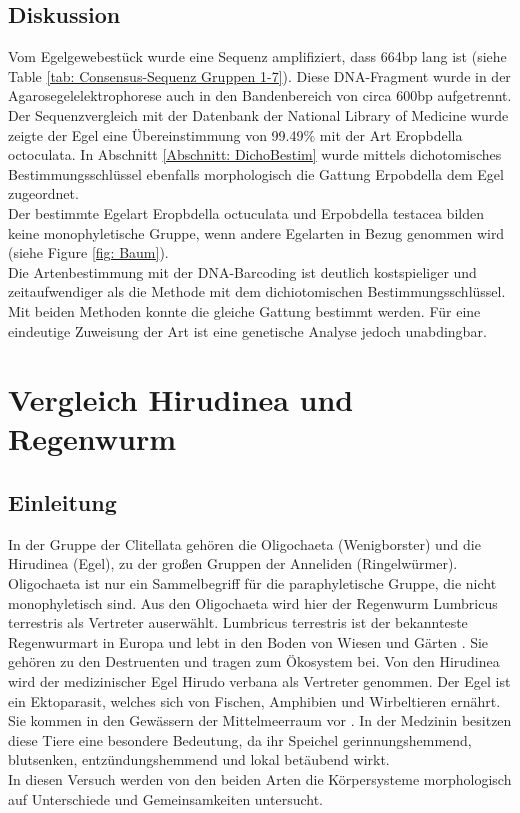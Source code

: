 \documentclass[oneside,10pt,a4paper]{report}
\begin{document}
			\subsection{Diskussion}
				Vom Egelgewebestück wurde eine Sequenz amplifiziert, dass 664bp lang ist (siehe Table \ref{tab: Consensus-Sequenz Gruppen 1-7}). Diese DNA-Fragment wurde in der Agarosegelelektrophorese auch in den Bandenbereich von circa 600bp aufgetrennt.\\
				Der Sequenzvergleich mit der Datenbank der National Library of Medicine wurde zeigte der Egel eine  Übereinstimmung von 99.49$\%$ mit der Art Eropbdella octoculata.  
				In Abschnitt \ref{Abschnitt: DichoBestim} wurde mittels dichotomisches Bestimmungsschlüssel ebenfalls morphologisch die Gattung Erpobdella dem Egel zugeordnet.\\
				Der bestimmte Egelart Eropbdella octuculata und Erpobdella testacea bilden keine monophyletische Gruppe, wenn andere Egelarten in Bezug genommen wird (siehe Figure \ref{fig: Baum}).\\
				Die Artenbestimmung mit der DNA-Barcoding ist deutlich kostspieliger und zeitaufwendiger als die Methode mit dem dichiotomischen Bestimmungsschlüssel. Mit beiden Methoden konnte die gleiche Gattung bestimmt werden.
				Für eine eindeutige Zuweisung der Art ist eine genetische Analyse jedoch unabdingbar.

				
		\section{Vergleich Hirudinea und Regenwurm}
			\subsection{Einleitung}
				In der Gruppe der Clitellata gehören die Oligochaeta (Wenigborster) und die Hirudinea (Egel), zu der großen Gruppen der Anneliden (Ringelwürmer).
				Oligochaeta ist nur ein Sammelbegriff für die paraphyletische Gruppe, die nicht monophyletisch sind. Aus den Oligochaeta wird hier der Regenwurm Lumbricus terrestris als Vertreter auserwählt. Lumbricus terrestris ist der bekannteste Regenwurmart in Europa und lebt in den Boden von Wiesen und Gärten \cite{regenwurm}. Sie gehören zu den Destruenten und tragen zum Ökosystem bei. Von den Hirudinea wird der medizinischer Egel Hirudo verbana als Vertreter genommen. Der Egel ist ein Ektoparasit, welches sich von Fischen, Amphibien und Wirbeltieren ernährt. Sie kommen in den Gewässern der Mittelmeerraum vor \cite{hirudo}. In der Medzinin  besitzen diese Tiere eine besondere Bedeutung, da ihr Speichel gerinnungshemmend, blutsenken, entzündungshemmend und lokal betäubend wirkt.\\
				In diesen Versuch werden von den beiden Arten die Körpersysteme morphologisch auf Unterschiede und Gemeinsamkeiten untersucht.\\
				
\end{document}
